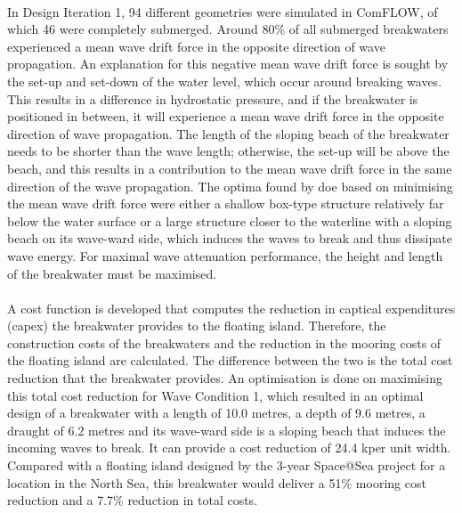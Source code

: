 \\
In Design Iteration 1, 94 different geometries were simulated in ComFLOW, of which 46 were completely submerged. Around 80\% of all submerged breakwaters experienced a mean wave drift force in the opposite direction of wave propagation. An explanation for this negative mean wave drift force is sought by the set-up and set-down of the water level, which occur around breaking waves. This results in a difference in hydrostatic pressure, and if the breakwater is positioned in between, it will experience a mean wave drift force in the opposite direction of wave propagation. The length of the sloping beach of the breakwater needs to be shorter than the wave length; otherwise, the set-up will be above the beach, and this results in a contribution to the mean wave drift force in the same direction of the wave propagation. The optima found by \acrshort{doe} based on minimising the mean wave drift force were either a shallow box-type structure relatively far below the water surface or a large structure closer to the waterline with a sloping beach on its wave-ward side, which induces the waves to break and thus dissipate wave energy. For maximal wave attenuation performance, the height and length of the breakwater must be maximised.\\
\\
A cost function is developed that computes the reduction in captical expenditures (\acrshort{capex}) the breakwater provides to the floating island. Therefore, the construction costs of the breakwaters and the reduction in the mooring costs of the floating island are calculated. The difference between the two is the total cost reduction that the breakwater provides. An optimisation is done on maximising this total cost reduction for Wave Condition 1, which resulted in an optimal design of a breakwater with a length of 10.0 metres, a depth of 9.6 metres, a draught of 6.2 metres and its wave-ward side is a sloping beach that induces the incoming waves to break. It can provide a cost reduction of 24.4 k\texteuro  per unit width. Compared with a floating island designed by the 3-year Space@Sea project for a location in the North Sea, this breakwater would deliver a 51\% mooring cost reduction and a 7.7\% reduction in total costs. 



